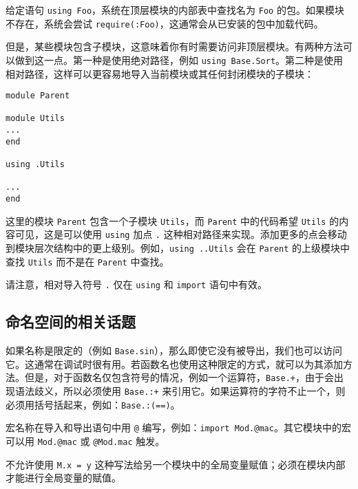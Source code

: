 给定语句 \texttt{using Foo}，系统在顶层模块的内部表中查找名为 \texttt{Foo} 的包。如果模块不存在，系统会尝试 \texttt{require(:Foo)}，这通常会从已安装的包中加载代码。



但是，某些模块包含子模块，这意味着你有时需要访问非顶层模块。有两种方法可以做到这一点。第一种是使用绝对路径，例如 \texttt{using Base.Sort}。第二种是使用相对路径，这样可以更容易地导入当前模块或其任何封闭模块的子模块：




\begin{lstlisting}
module Parent

module Utils
...
end

using .Utils

...
end
\end{lstlisting}



这里的模块 \texttt{Parent} 包含一个子模块 \texttt{Utils}，而 \texttt{Parent} 中的代码希望 \texttt{Utils} 的内容可见，这是可以使用 \texttt{using} 加点 \texttt{.} 这种相对路径来实现。添加更多的点会移动到模块层次结构中的更上级别。例如，\texttt{using ..Utils} 会在 \texttt{Parent} 的上级模块中查找 \texttt{Utils} 而不是在 \texttt{Parent} 中查找。



请注意，相对导入符号 \texttt{.} 仅在 \texttt{using} 和 \texttt{import} 语句中有效。



\hypertarget{5019601776205271706}{}


\subsection{命名空间的相关话题}



如果名称是限定的（例如 \texttt{Base.sin}），那么即使它没有被导出，我们也可以访问它。这通常在调试时很有用。若函数名也使用这种限定的方式，就可以为其添加方法。但是，对于函数名仅包含符号的情况，例如一个运算符，\texttt{Base.+}，由于会出现语法歧义，所以必须使用 \texttt{Base.:+} 来引用它。如果运算符的字符不止一个，则必须用括号括起来，例如：\texttt{Base.:(==)}。



宏名称在导入和导出语句中用 \texttt{@} 编写，例如：\texttt{import Mod.@mac}。其它模块中的宏可以用 \texttt{Mod.@mac} 或 \texttt{@Mod.mac} 触发。



不允许使用 \texttt{M.x = y} 这种写法给另一个模块中的全局变量赋值；必须在模块内部才能进行全局变量的赋值。



